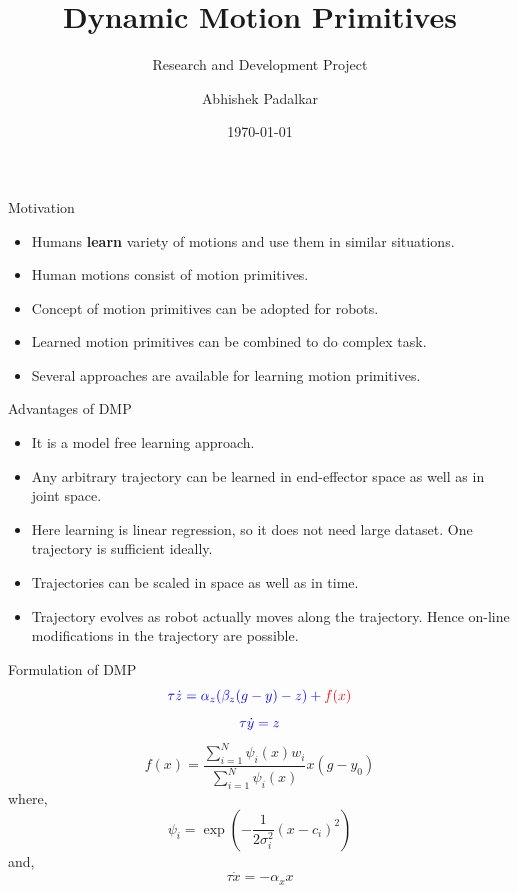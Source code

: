 \documentclass{beamer}
\author[]{Abhishek Padalkar}
\title{Dynamic Motion Primitives}
\subtitle{Research and Development Project}
\institute[HBRS]{Hochschule Bonn-Rhein-Sieg}
\date{\today}
\begin{document}
	{
	\begin{frame}
	\titlepage
	\end{frame}
	}
	
	\begin{frame}{Motivation}
		\begin{itemize}
			\item Humans \textbf{learn} variety of motions and use them in similar situations. 
			\item Human motions consist of motion primitives. 
			\item Concept of motion primitives can be adopted for robots. 
			\item Learned motion primitives can be combined to do complex task. 
			\item Several approaches are available for learning motion primitives.
		\end{itemize}
	\end{frame}
	
	
	\begin{frame}{Advantages of DMP}
		\begin{itemize}
			\item It is a model free learning approach.
			\item Any arbitrary trajectory can be learned in end-effector space as well as in joint space.
			\item Here learning is linear regression, so it does not need large dataset.
			One trajectory is sufficient ideally.
			\item Trajectories can be scaled in space as well as in time.
			\item Trajectory evolves as robot actually moves along the trajectory. Hence on-line modifications in the trajectory are possible.

		\end{itemize}
	\end{frame}

	\begin{frame}{Formulation of DMP}
		\begin{equation}\label{DMP_1}
		\color{blue}\tau\dot{z} = \alpha_{z}(\beta_{z}(g - y) - z) + \color{red}f(x) \color{black}
		\end{equation}
		\begin{equation}\label{DMP_2}
		\color{blue}\tau \dot{y} = z \color{black}
		\end{equation}
		\begin{equation}\label{forcing_term}
		f(x) = \frac{\sum_{i=1}^{N}\psi_{i}(x)w_{i}}{\sum_{i=1}^{N}\psi_{i}(x)}x(g - y_{0})
		\end{equation}
		where,
		\begin{equation}\label{psi}
		\psi_{i} = \exp(-{\frac{1}{2\sigma_{i}^{2}}(x - c_{i})^{2}})
		\end{equation}
		and,
		\begin{equation}\label{canonical}
		\tau \dot{x} = -\alpha_{x}x
		\end{equation}
	\end{frame}
	
\end{document}
